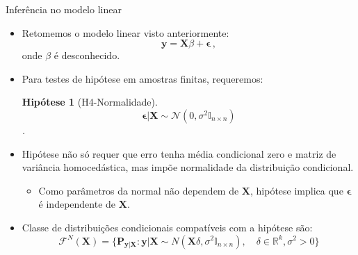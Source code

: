 \documentclass[11pt]{beamer}
\newtheorem{assumption}{Hipótese}
\begin{document}
\begin{frame}{Inferência no modelo linear}
\begin{itemize}
	\item Retomemos o modelo linear visto anteriormente:
$$\boldsymbol{y} =\boldsymbol{X}\beta + \boldsymbol{\epsilon}\, ,$$
onde $\beta$ é desconhecido.
\item Para testes de hipótese em amostras finitas, requeremos:
\begin{assumption}[H4-Normalidade]
$$\boldsymbol{\epsilon}|\boldsymbol{X}\sim \mathcal{N}(0,\sigma^2 \mathbb{I}_{n\times n})$$.
\end{assumption}
\item Hipótese não só requer que erro tenha média condicional zero e matriz de variância homocedástica, mas impõe normalidade da distribuição condicional.
\begin{itemize}
	\item Como parâmetros da normal não dependem de $\boldsymbol{X}$, hipótese implica que $\boldsymbol{\epsilon}$ é independente de $\boldsymbol{X}$.
\end{itemize}
\item Classe de distribuições condicionais compatíveis com a hipótese são:
$$\mathcal{F}^N(\boldsymbol{X}) = \{\boldsymbol{P}_{\boldsymbol{y}|\boldsymbol{X}}: \boldsymbol{y}|\boldsymbol{X}\sim N(\boldsymbol{X}\delta, \sigma^2 \mathbb{I}_{n\times n}),\quad \delta \in \mathbb{R}^k, \sigma^2>0\}$$ 
\end{itemize}
\end{frame}
\end{document}

